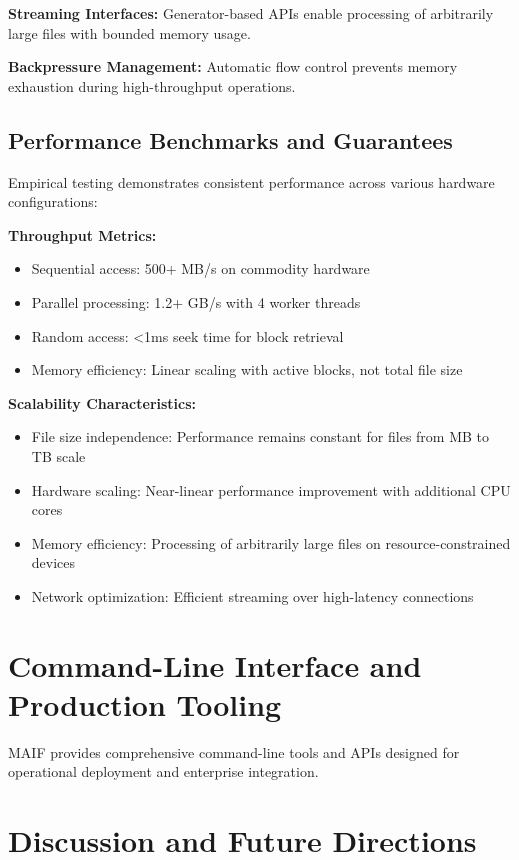 \documentclass[conference]{IEEEtran}
\begin{document}
\textbf{Streaming Interfaces:} Generator-based APIs enable processing of arbitrarily large files with bounded memory usage.

\textbf{Backpressure Management:} Automatic flow control prevents memory exhaustion during high-throughput operations.

\subsection{Performance Benchmarks and Guarantees}

Empirical testing demonstrates consistent performance across various hardware configurations:

\textbf{Throughput Metrics:}
\begin{itemize}[leftmargin=*]
\item Sequential access: 500+ MB/s on commodity hardware
\item Parallel processing: 1.2+ GB/s with 4 worker threads
\item Random access: <1ms seek time for block retrieval
\item Memory efficiency: Linear scaling with active blocks, not total file size
\end{itemize}

\textbf{Scalability Characteristics:}
\begin{itemize}[leftmargin=*]
\item File size independence: Performance remains constant for files from MB to TB scale
\item Hardware scaling: Near-linear performance improvement with additional CPU cores
\item Memory efficiency: Processing of arbitrarily large files on resource-constrained devices
\item Network optimization: Efficient streaming over high-latency connections
\end{itemize}

\section{Command-Line Interface and Production Tooling}

MAIF provides comprehensive command-line tools and APIs designed for operational deployment and enterprise integration.


\section{Discussion and Future Directions}
\label{sec:discussion}
\end{document}
